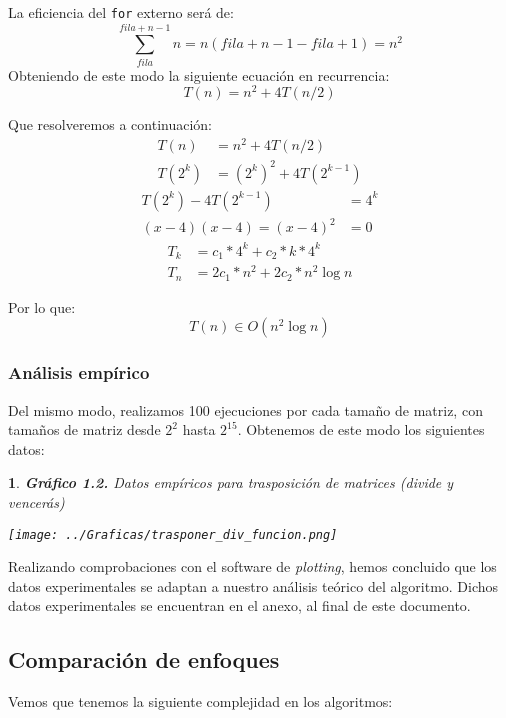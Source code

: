 \documentclass[10pt, a4paper]{article}
\theoremstyle{theorem-style}
\newtheorem*{datos}{}
\theoremstyle{theorem-style}
\theoremstyle{definition-style}
\theoremstyle{remark-style}
\theoremstyle{example-style}
\theoremstyle{definition-style}
\theoremstyle{remark-style}
\begin{document}
La eficiencia del \texttt{for} externo será de:
$$ \sum_{fila}^{fila+n-1} n = n(fila+n-1-fila+1) = n^2 $$
Obteniendo de este modo la siguiente ecuación en recurrencia:
$$ T(n) = n^2 + 4T(n/2) $$

Que resolveremos a continuación:
\begin{align*}
T(n) &= n^2 + 4T(n/2)\\
T(2^k) &= (2^k)^2 + 4T(2^{k-1})
\end{align*}
\begin{align*}
T(2^k) - 4T(2^{k-1}) &= 4^k\\
(x-4)(x-4)=(x-4)^2 &= 0
\end{align*}
\begin{align*}
T_k &= c_1*4^k + c_2*k*4^k\\
T_n &= 2c_1*n^2+2c_2*n^2\log n
\end{align*}

Por lo que:
$$T(n)\in O(n^2\log n)$$

\pagebreak

\subsubsection{Análisis empírico}

Del mismo modo, realizamos 100 ejecuciones por cada tamaño de matriz, con tamaños de matriz desde $2^2$ hasta $2^{15}$. Obtenemos de este modo los siguientes datos:

\begin{datos}
	{\bf\sffamily Gráfico 1.2.} {\sffamily Datos empíricos para trasposición de matrices (divide y vencerás)}\\
	\vspace{-0.7cm}
	\begin{center}
		\texttt{[image: ../Graficas/trasponer\_div\_funcion.png]}
	\end{center}	
\end{datos}

Realizando comprobaciones con el software de \emph{plotting}, hemos concluido que los datos experimentales se adaptan a nuestro análisis teórico del algoritmo. Dichos datos experimentales se encuentran en el anexo, al final de este documento.

\pagebreak
\subsection{Comparación de enfoques}

Vemos que tenemos la siguiente complejidad en los algoritmos:
\end{document}
